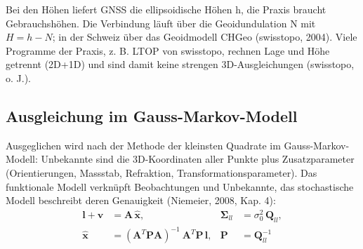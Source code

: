 Bei den Höhen liefert GNSS die ellipsoidische Höhen h, die Praxis braucht Gebrauchshöhen. 
Die Verbindung läuft über die Geoidundulation N mit $H = h - N$; in der Schweiz über das Geoidmodell CHGeo (swisstopo, 2004).
Viele Programme der Praxis, z. B. LTOP von swisstopo, rechnen Lage und Höhe getrennt (2D+1D) und sind damit keine strengen 3D-Ausgleichungen (swisstopo, o. J.).

\subsection{Ausgleichung im Gauss-Markov-Modell}
\label{sec:Ausgleichung im Gauss-Markov-Modell}

Ausgeglichen wird nach der Methode der kleinsten Quadrate im Gauss-Markov-Modell: Unbekannte sind die 3D-Koordinaten aller Punkte plus Zusatzparameter (Orientierungen, Massstab, Refraktion, Transformationsparameter). 
Das funktionale Modell verknüpft Beobachtungen und Unbekannte, das stochastische Modell beschreibt deren Genauigkeit (Niemeier, 2008, Kap. 4):
\[
\begin{aligned}
\mathbf{l} + \mathbf{v} &= \mathbf{A}\,\hat{\mathbf{x}}, &
\boldsymbol{\Sigma}_{ll} &= \sigma_0^2\,\mathbf{Q}_{ll}, \\
\hat{\mathbf{x}} &= \left(\mathbf{A}^{T}\mathbf{P}\mathbf{A}\right)^{-1}
\                    \mathbf{A}^{T}\mathbf{P}\,\mathbf{l}, &
\mathbf{P} &= \mathbf{Q}_{ll}^{-1}
\end{aligned}
\]

